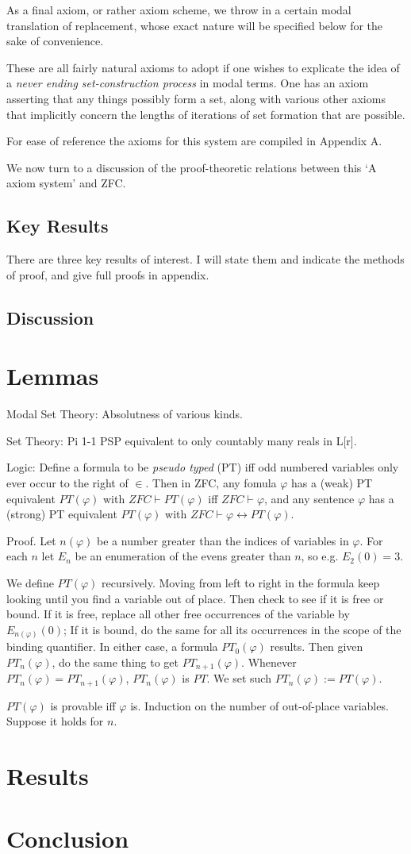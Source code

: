 \documentclass{article}
\begin{document}
As a final axiom, or rather axiom scheme, we throw in a certain modal translation of replacement,
whose exact nature will be specified below for the sake of convenience.

These are all fairly natural axioms to adopt if one wishes to explicate the idea 
of a \emph{never ending set-construction process} in modal terms. One has an axiom 
asserting that any things possibly form a set, along with various other axioms 
that implicitly concern the lengths of iterations of set formation that are possible.

For ease of reference the axioms 
for this system are compiled in Appendix A. 

We now turn to a discussion of the proof-theoretic relations between this `A axiom system'
and ZFC.
\subsection{Key Results}
There are three key results of interest. I will state them and indicate the methods of proof,
and give full proofs in appendix.
\subsection{Discussion}
\section{Lemmas}
Modal Set Theory:
Absolutness of various kinds.

Set Theory: 
Pi 1-1 PSP equivalent to only countably many reals in L[r].

Logic: 
Define a formula to be \emph{pseudo typed} (PT) iff 
odd numbered variables only ever occur
to the right of $\in$. 
Then in ZFC, any fomula $\varphi$ has a (weak) PT equivalent
$PT(\varphi)$ with $ZFC \vdash PT(\varphi)$ iff $ZFC \vdash \varphi$, 
and any sentence 
$\varphi$ has a (strong) PT equivalent $PT(\varphi)$ with 
$ZFC \vdash \varphi \leftrightarrow PT(\varphi)$.

Proof. Let $n(\varphi)$ be a number greater than the indices of variables in 
$\varphi$. For each $n$ let $E_n$ be an enumeration of 
the evens greater than $n$, so e.g. $E_2(0)=3$. 

We define $PT(\varphi)$ recursively. Moving from left to right in the formula 
keep looking until you find a variable out of place. Then check to see 
if it is free or bound. If it is free, replace all other free occurrences of the 
variable by $E_{n(\varphi)}(0)$; If 
it is bound, do the same for all its occurrences in the scope 
of the binding quantifier. In either case, a formula $PT_0(\varphi)$
results. Then given $PT_n(\varphi)$, do the same thing to get $PT_{n+1}(\varphi)$.
Whenever $PT_n(\varphi) = PT_{n+1}(\varphi)$, $PT_n(\varphi)$ is $PT$. We set 
such $PT_n(\varphi) := PT(\varphi)$.

$PT(\varphi)$ is provable iff $\varphi$ is. Induction on the number of out-of-place 
variables. Suppose it holds for $n$. 
\section{Results}
\section{Conclusion}
\end{document}
